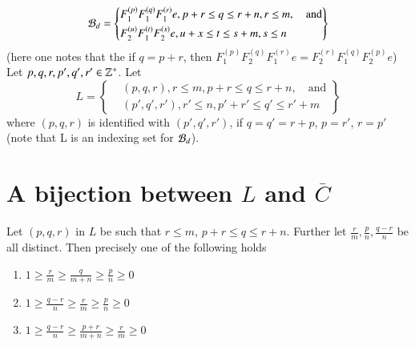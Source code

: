 \begin{equation*}
\mathcal{B}_{d}= \left\{
\begin{aligned}
&F_{1}^{(p)} F_{1}^{(q)} F_{1}^{(r)} e, p+r \leq q \leq r + n, r \leq m,\quad  \text{and}\\
&F_{2}^{(u)} F_{1}^{(t)} F_{2}^{(s)} e, u+x\leq t \leq s + m, s \leq n
\end{aligned}
\right\}
 \end{equation*}
(here one notes that the if $q=p+r$, then $F_{1}^{(p)} F_{2}^{(q)} F_{1}^{(r)} e = F_{2}^{(r)} F_{1}^{(q)} F_{2}^{(p)}e$) Let $p, q, r, p', q', r' \in \mathbb{Z}^{+}$. Let
\begin{equation*}
L=\left\{
\begin{aligned}
&(p,q,r), r \leq m, p+r \leq q \leq r + n, \quad \text{and}\\
&(p',q',r'), r' \leq n, p'+r' \leq q' \leq r' + m
\end{aligned}
\right\}
\end{equation*}
where $(p,q,r)$ is identified with $(p',q', r')$, if $q= q' = r + p$, $p= r'$, $r=p'$ (note that L is an indexing set for $\mathcal{B}_{d}$).

\section {A bijection between $L$ and  $\overline{C}$}\label{art9-sec-5}

\begin{lemma}\label{art9-lemma-5.1}
Let $(p,q,r)$ in $L$ be such that $ r \leq m$, $p + r \leq q \leq r + n$. Further let $\frac{r}{m}, \frac{p}{n}, \frac{q-r}{n}$ be all distinct. Then precisely one of the following holds
\begin{enumerate}[{\rm (1)}]
\item $1 \geq \frac{r}{m}\geq \frac{q}{m+n} \geq \frac{p}{n} \geq 0$\label{art9-lemma5.1-enum-1}

\item $1 \geq \frac{q-r}{n} \geq \frac{r}{m} \geq \frac{p}{n} \geq 0$ \label{art9-lemma5.1-enum-2}

\item $1 \geq \frac{q-r}{n} \geq \frac{p+r}{m+n} \geq \frac{r}{m} \geq 0$\label{art9-lemma5.1-enum-3}
\end{enumerate}
\end{lemma}


